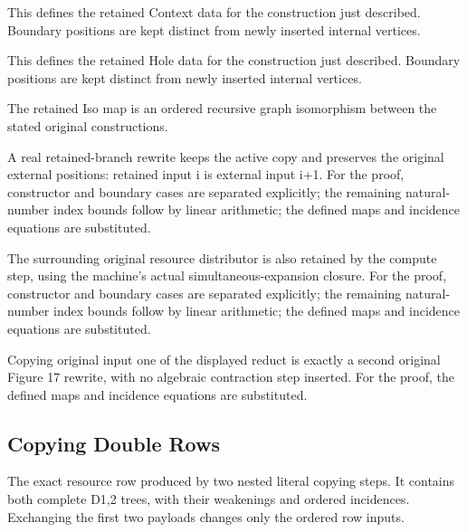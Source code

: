 This defines the retained Context data for the construction just described. Boundary positions are kept distinct from newly inserted internal vertices.
\par{}

This defines the retained Hole data for the construction just described. Boundary positions are kept distinct from newly inserted internal vertices.
\par{}

The retained Iso map is an ordered recursive graph isomorphism between the stated original constructions.
\par{}

A real retained-branch rewrite keeps the active copy and preserves the original external positions: retained input i is external input i+1.
For the proof, constructor and boundary cases are separated explicitly; the remaining natural-number index bounds follow by linear arithmetic; the defined maps and incidence equations are substituted.
\par{}

The surrounding original resource distributor is also retained by the compute step, using the machine's actual simultaneous-expansion closure.
For the proof, constructor and boundary cases are separated explicitly; the remaining natural-number index bounds follow by linear arithmetic; the defined maps and incidence equations are substituted.
\par{}

Copying original input one of the displayed reduct is exactly a second original Figure 17 rewrite, with no algebraic contraction step inserted.
For the proof, the defined maps and incidence equations are substituted.
\par{}

\subsection{Copying Double Rows}
The exact resource row produced by two nested literal copying steps. It contains both complete D1,2 trees, with their weakenings and ordered incidences. Exchanging the first two payloads changes only the ordered row inputs.

